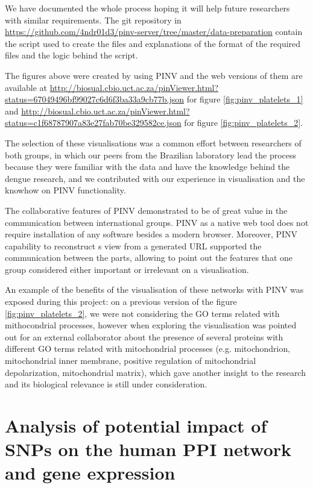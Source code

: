 We have documented the whole process hoping it will help future researchers with similar requirements. The git repository in \url{https://github.com/4ndr01d3/pinv-server/tree/master/data-preparation} contain the script used to create the files and explanations of the format of the required files and the logic behind the script.

The figures above were created by using PINV and the web versions of them are available at \url{http://biosual.cbio.uct.ac.za/pinViewer.html?status=67049496bf99027c6d6f3ba33a9cb77b.json} for figure \ref{fig:pinv_platelets_1} and \url{http://biosual.cbio.uct.ac.za/pinViewer.html?status=c1f68787907a83e27fab70be329582ce.json} for figure \ref{fig:pinv_platelets_2}.

The selection of these visualisations was a common effort between researchers of both groups, in which our peers from the Brazilian laboratory lead the process because they were familiar with the data and have the knowledge behind the dengue research, and we contributed with our experience in visualisation and the knowhow on PINV functionality.

The collaborative features of PINV demonstrated to be of great value in the communication between international groups. PINV as a native web tool does not require installation of any software besides a modern browser. Moreover, PINV capability to reconstruct s view from a generated URL supported the communication between the parts, allowing to point out the features that one group considered either important or irrelevant on a visualisation.

An example of the benefits of the visualisation of these networks with PINV was exposed during this project: on a previous version of the figure \ref{fig:pinv_platelets_2}, we were not considering the GO terms related with mithocondrial processes, however when exploring the visualisation was pointed out for an external collaborator about the presence of several proteins with different GO terms related with mitochondrial processes (e.g.  mitochondrion, mitochondrial inner membrane, positive regulation of mitochondrial depolarization, mitochondrial matrix), which gave another insight to the research and its biological relevance is still under consideration.



\section{Analysis of potential impact of SNPs on the human PPI network and gene expression}
\label{sec:pop_genetics}
